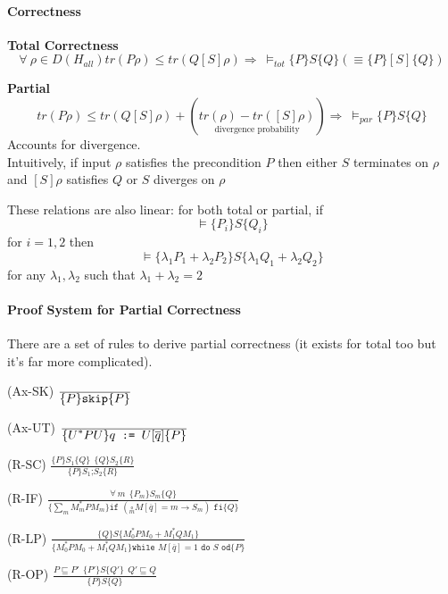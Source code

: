 \documentclass[10pt]{report}
\begin{document}
\paragraph{Correctness}
\begin{list}{}{}
	\item \textbf{Total Correctness} $$\forall\:\rho\in D(H_{all}) tr(P\rho)\leq tr(Q[S]\rho)\Rightarrow\:\vDash_{tot}\{P\}S\{Q\}\left(\equiv\{P\}[S]\{Q\}\right)$$
	\item \textbf{Partial} $$tr(P\rho)\leq tr(Q[S]\rho)+(\underset{\text{divergence probability}}{tr(\rho)-tr([S]\rho)})\Rightarrow\:\vDash_{par}\{P\}S\{Q\}$$ Accounts for divergence.\\
	Intuitively, if input $\rho$ satisfies the precondition $P$ then either $S$ terminates on $\rho$ and $[S]\rho$ satisfies $Q$ or $S$ diverges on $\rho$
\end{list}
These relations are also linear: for both total or partial, if $$\vDash\{P_i\}S\{Q_i\}$$ for $i=1,2$ then $$\vDash\{\lambda_1P_1+\lambda_2P_2\}S\{\lambda_1Q_1+\lambda_2Q_2\}$$ for any $\lambda_1,\lambda_2$ such that $\lambda_1+\lambda_2=2$
\paragraph{Proof System for Partial Correctness} There are a set of rules to derive partial correctness (it exists for total too but it's far more complicated).
\begin{list}{}{}
	\item[(Ax-SK)] $\frac{\displaystyle}{\displaystyle \{P\}\texttt{skip}\{P\}}$
	\item[(Ax-UT)] $\frac{\displaystyle }{\displaystyle \{U^*PU\}q\texttt{ := }U[\overline{q}]\{P\}}$
	\item[(R-SC)] $\frac{\displaystyle \{P\}S_1\{Q\}\:\:\{Q\}S_2\{R\}}{\displaystyle \{P\}S_1\texttt{;}S_2\{R\}}$
	\item[(R-IF)] $\frac{\displaystyle\forall\:m\:\: \{P_m\}S_m\{Q\}}{\displaystyle \{\sum_mM_m^*PM_m\}\texttt{if }(\underset{m}{\square}M[\overline{q}]=m\rightarrow S_m)\texttt{ fi}\{Q\}}$
	\item[(R-LP)] $\frac{\displaystyle \{Q\}S\{M_0^*PM_0+M_1^*QM_1\}}{\displaystyle \{M_0^*PM_0+M_1^*QM_1\}\texttt{while }M[\overline{q}]=1\texttt{ do }S\texttt{ od}\{P\}}$
	\item[(R-OP)] $\frac{\displaystyle P\sqsubseteq P'\:\:\{P'\}S\{Q'\}\:\:Q'\sqsubseteq Q}{\displaystyle \{P\}S\{Q\}}$
\end{list}
\end{document}
